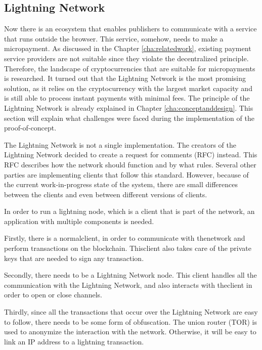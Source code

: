 \subsection{Lightning Network}
\label{sec:lightningnetwork}

Now there is an ecosystem that enables publishers to communicate with a service that runs outside the browser. This service, somehow, needs to make a micropayment. As discussed in the Chapter \ref{cha:relatedwork}, existing payment service providers are not suitable since they violate the decentralized principle. Therefore, the landscape of cryptocurrencies that are suitable for micropayments is researched. It turned out that the Lightning Network is the most promising solution, as it relies on the cryptocurrency with the largest market capacity and is still able to process instant payments with minimal fees. The principle of the Lightning Network is already explained in Chapter \ref{cha:conceptanddesign}. This section will explain what challenges were faced during the implementation of the proof-of-concept.

The Lightning Network is not a single implementation. The creators of the Lightning Network decided to create a request for comments (RFC) instead. This RFC describes how the network should function and by what rules. Several other parties are implementing clients that follow this standard. However, because of the current work-in-progress state of the system, there are small differences between the clients and even between different versions of clients. 

In order to run a lightning node, which is a client that is part of the network, an application with multiple components is needed. 

Firstly, there is a normalclient, in order to communicate with thenetwork and perform transactions on the blockchain. Thisclient also takes care of the private keys that are needed to sign any transaction.

Secondly, there needs to be a Lightning Network node. This client handles all the communication with the Lightning Network, and also interacts with theclient in order to open or close channels. 

Thirdly, since all the transactions that occur over the Lightning Network are easy to follow, there needs to be some form of obfuscation. The union router (TOR) is used to anonymize the interaction with the network. Otherwise, it will be easy to link an IP address to a lightning transaction.


